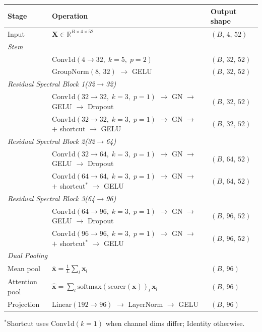 \documentclass[11pt,a4paper]{article}
\begin{document}
\begin{center}
\renewcommand{\arraystretch}{1.15}
\begin{tabular}{l l l}
\toprule
\textbf{Stage} & \textbf{Operation} & \textbf{Output shape} \\
\midrule
Input & $\mathbf{X}\in\mathbb{R}^{B\times 4 \times 52}$ & $(B,\,4,\,52)$ \\
\midrule
\multicolumn{3}{l}{\textit{Stem}} \\
& Conv1d$(4 \to 32,\;k{=}5,\;p{=}2)$ & $(B,\,32,\,52)$ \\
& GroupNorm$(8,\,32)$ $\to$ GELU & $(B,\,32,\,52)$ \\
\midrule
\multicolumn{3}{l}{\textit{Residual Spectral Block 1\;(32$\to$32)}} \\
& Conv1d$(32\to 32,\;k{=}3,\;p{=}1)$ $\to$ GN $\to$ GELU $\to$ Dropout & $(B,\,32,\,52)$ \\
& Conv1d$(32\to 32,\;k{=}3,\;p{=}1)$ $\to$ GN $\to$ $+$ shortcut $\to$ GELU & $(B,\,32,\,52)$ \\
\midrule
\multicolumn{3}{l}{\textit{Residual Spectral Block 2\;(32$\to$64)}} \\
& Conv1d$(32\to 64,\;k{=}3,\;p{=}1)$ $\to$ GN $\to$ GELU $\to$ Dropout & $(B,\,64,\,52)$ \\
& Conv1d$(64\to 64,\;k{=}3,\;p{=}1)$ $\to$ GN $\to$ $+$ shortcut$^*$ $\to$ GELU & $(B,\,64,\,52)$ \\
\midrule
\multicolumn{3}{l}{\textit{Residual Spectral Block 3\;(64$\to$96)}} \\
& Conv1d$(64\to 96,\;k{=}3,\;p{=}1)$ $\to$ GN $\to$ GELU $\to$ Dropout & $(B,\,96,\,52)$ \\
& Conv1d$(96\to 96,\;k{=}3,\;p{=}1)$ $\to$ GN $\to$ $+$ shortcut$^*$ $\to$ GELU & $(B,\,96,\,52)$ \\
\midrule
\multicolumn{3}{l}{\textit{Dual Pooling}} \\
Mean pool & $\bar{\mathbf{x}} = \frac{1}{L}\sum_l \mathbf{x}_l$ & $(B,\,96)$ \\
Attention pool & $\hat{\mathbf{x}} = \sum_l \text{softmax}(\text{scorer}(\mathbf{x}))_l\,\mathbf{x}_l$ & $(B,\,96)$ \\
\midrule
Projection & Linear$(192\to 96)$ $\to$ LayerNorm $\to$ GELU & $(B,\,96)$ \\
\bottomrule
\end{tabular}
\end{center}

\smallskip
\noindent $^*$Shortcut uses Conv1d$(k{=}1)$ when channel dims differ; Identity otherwise.
\end{document}
